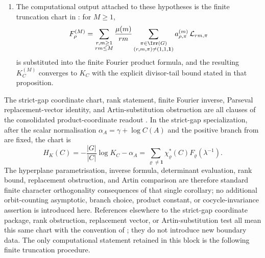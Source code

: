 \begin{enumerate}[label=\textup{(B\arabic*)},leftmargin=*]
  \item The computational output attached to these hypotheses is the finite
  truncation chart in
  : for \(M\ge1\),
  \[
    F^{(M)}_\rho
    =
    \sum_{\substack{r,m\ge1\\rm\le M}}
      \frac{\mu(m)}{rm}
      \sum_{\substack{\pi\in\Irr(G)\\(r,m,\pi)\neq(1,1,\mathbf1)}}
        a_{\rho,\pi}^{(m)}\,\mathcal L_{rm,\pi}
  \]
  is substituted into the finite Fourier product formula, and the resulting
  \(K_C^{(M)}\) converges to \(K_C\) with the explicit divisor-tail bound
  stated in that proposition.
\end{enumerate}

The strict-gap coordinate chart, rank statement, finite Fourier inverse,
Parseval replacement-vector identity, and Artin-substitution obstruction are
all clauses of the consolidated product-coordinate readout
.  In the strict-gap
specialization, after the scalar normalisation
\(\alpha_A=\gamma+\log C(A)\) and the positive branch from
 are fixed, the chart is
\[
  H_K(C)=-\frac{|G|}{|C|}\log K_C-\alpha_A
  =
  \sum_{\varrho\ne\mathbf1}
    \chi_\varrho^\ast(C)F_\varrho(\lambda^{-1}).
\]
The hyperplane parametrisation, inverse formula, determinant evaluation,
rank bound, replacement obstruction, and Artin comparison are therefore
standard finite character orthogonality consequences of that single corollary;
no additional orbit-counting asymptotic, branch choice, product constant, or
cocycle-invariance assertion is introduced here.  References elsewhere to the
strict-gap coordinate package, rank obstruction, replacement vector, or
Artin-substitution test all mean this same chart with the convention of
; they do not introduce new
boundary data.  The only computational statement retained in this block is the
following finite truncation procedure.
